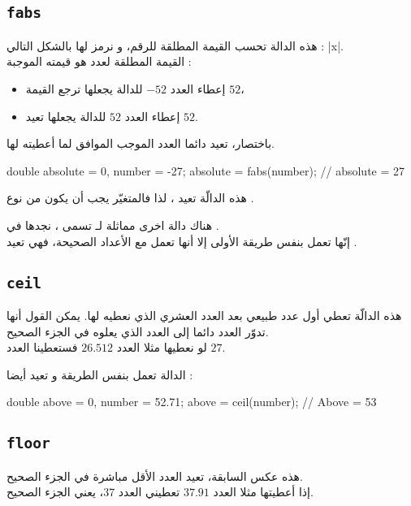 \subsection{\texttt{fabs}}

هذه الدالة تحسب القيمة المطلقة للرقم، و نرمز لها بالشكل التالي :
\textenglish{|x|}.\\
القيمة المطلقة لعدد هو قيمته الموجبة :

\begin{itemize}
  \item إعطاء العدد $ -52 $ للدالة يجعلها ترجع القيمة $ 52 $،
  \item إعطاء العدد $ 52 $ للدالة يجعلها تعيد $ 52 $.
\end{itemize}

باختصار، تعيد دائما العدد الموجب الموافق لما أعطيته لها.

\begin{Console}
double absolute = 0, number = -27;
absolute = fabs(number); // absolute = 27
\end{Console}

هذه الدالّة تعيد
،
لذا فالمتغيّر
يجب أن يكون من نوع
.

\begin{information}
هناك دالة اخرى مماثلة لـ
تسمى
،
نجدها في
.\\
إنّها تعمل بنفس طريقة الأولى إلا أنها تعمل مع الأعداد الصحيحة، فهي تعيد
.
\end{information}

\subsection{\texttt{ceil}}

هذه الدالّة تعطي أول عدد طبيعي بعد العدد العشري الذي نعطيه لها. يمكن القول أنها تدوّر العدد دائما إلى العدد الذي يعلوه في الجزء الصحيح.\\
لو نعطيها مثلا العدد $ 26.512 $ فستعطينا العدد $ 27 $.

الدالة تعمل بنفس الطريقة و تعيد
أيضا :

\begin{Csource}
double above = 0, number = 52.71;
above = ceil(number); // Above = 53
\end{Csource}

\subsection{\texttt{floor}}
هذه عكس السابقة، تعيد العدد الأقل مباشرة في الجزء الصحيح.\\
إذا أعطيتها مثلا العدد $ 37.91 $ تعطيني العدد $ 37 $، يعني الجزء الصحيح.


